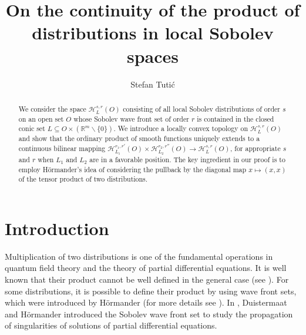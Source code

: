 \documentclass{amsart}
\theoremstyle{definition}
\begin{document}
\title{On the continuity of the product of distributions in local Sobolev spaces}

\author{Stefan Tuti\'c}
\address{Department of Mathematics and Informatics \\ 
Faculty of Sciences University of Novi Sad \\
Trg Dositeja Obradovi\'ca 3 \\
21000 Novi Sad, Serbia}


\begin{abstract} 
We consider the space $\mathscr{H}_L ^{s,r} (O)$ consisting of all local Sobolev distributions of order $s$ on an open set $O$ whose Sobolev wave front set of order $r$ is contained in the closed conic set $L\subseteq O\times(\mathbb{R}^m\backslash\{0\})$. We introduce a locally convex topology on $\mathscr{H}_L ^{s,r} (O)$ and show that the ordinary product of smooth functions uniquely extends to a continuous bilinear mapping $\mathscr{H}_{L_1} ^{r_1,r'} (O) \times \mathscr{H}_{L_2} ^{r_2,r''} (O) \to \mathscr{H}_{L} ^{s,r} (O)$, for appropriate $s$ and $r$ when $L_1$ and $L_2$ are in a favorable position. The key ingredient in our proof is to employ H\"ormander's idea of considering the pullback by the diagonal map $x\mapsto (x,x)$ of the tensor product of two distributions.
\end{abstract}



\maketitle

\section{Introduction}\label{sec1}


Multiplication of two distributions is one of the fundamental operations in quantum field theory and the theory of partial differential equations. It is well known that their product cannot be well defined in the general case (see \cite{Schwartz}). For some distributions, it is possible to define their product by using wave front sets, which were introduced by H\"ormander (for more details see \cite{HNonlinear}). In \cite{Duistermaat}, Duistermaat and H\"ormander introduced the Sobolev wave front set to study the propagation of singularities of solutions of partial differential equations.
\end{document}
